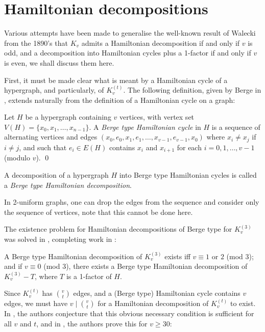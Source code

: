\section{Hamiltonian decompositions}

Various attempts have been made to generalise the well-known result of Walecki
from the 1890's that $K_v$ admits a Hamiltonian decomposition if and only if
$v$ is odd, and a decomposition into Hamiltonian cycles plus a 1-factor if and
only if $v$ is even, we shall discuss them here.

First, it must be made clear what is meant by a Hamiltonian cycle of a
hypergraph, and particularly, of $K_v^{(t)}$. The following definition,
given by Berge in \cite{berge}, extends naturally from the definition of a
Hamiltonian cycle on a graph:

\begin{definition}
Let $H$ be a hypergraph containing $v$ vertices, with vertex set
$V(H) = \{x_0, x_1, \ldots, x_{n-1}\}$. A {\em Berge type Hamiltonian cycle}
in $H$ is a sequence of alternating vertices and edges $(x_0, e_0, x_1, e_1,
\ldots, x_{v-1}, e_{v-1}, x_0)$ where $x_i \neq x_j$ if $i \neq j$, and such
that $e_i \in E(H)$ contains $x_i$ and $x_{i+1}$ for each $i = 0,1,\ldots,v-1$
(modulo $v$).
\qed
\end{definition}

A decomposition of a hypergraph $H$ into Berge type Hamiltonian cycles is called
a {\em Berge type Hamiltonian decomposition}.

In 2-uniform graphs, one can drop the edges from the sequence and consider only the
sequence of vertices, note that this cannot be done here.

The existence problem for Hamiltonian decompositions of Berge type for
$K_{v}^{(3)}$ was solved in \cite{verall}, completing work in \cite{bermond-al}:

\begin{theorem} \label{berge-hamilton}
A Berge type Hamiltonian decomposition of $K_v^{(3)}$ exists iff $v
\equiv 1$ or $2$ (mod $3$); and if $v \equiv 0$ (mod 3), there exists a
Berge type Hamiltonian decomposition of $K_v^{(3)} - T$, where $T$ is a
1-factor of $H$.
\end{theorem}

Since $K_v^{(t)}$ has $v \choose t$ edges, and a (Berge type) Hamiltonian cycle
contains $v$ edges, we must have $v \mid {v \choose t}$ for a Hamiltonian
decomposition of $K_v^{(t)}$ to exist. In \cite{bermond}, the authors conjecture
that this obvious necessary condition is sufficient for all $v$ and $t$, and in
\cite{kuhn-osthus}, the authors prove this for $v \geq 30$:

